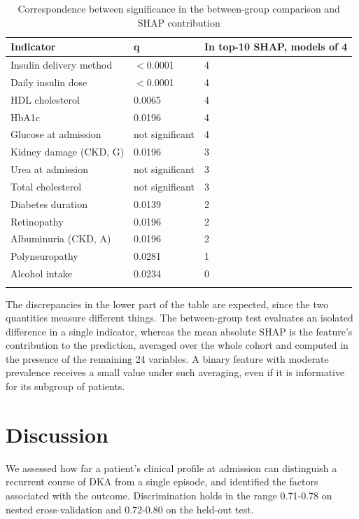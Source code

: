 \documentclass[pdflatex,sn-basic,Numbered]{sn-jnl}
\begin{document}
\begin{table}[h]
\caption{Correspondence between significance in the between-group comparison and SHAP contribution}\label{tab7}%
\begin{tabular}{@{}lll@{}}
\toprule
Indicator & q & In top-10 SHAP, models of 4\\
\midrule
Insulin delivery method & $<$0.0001 & 4\\
Daily insulin dose & $<$0.0001 & 4\\
HDL cholesterol & 0.0065 & 4\\
HbA1c & 0.0196 & 4\\
Glucose at admission & not significant & 4\\
Kidney damage (CKD, G) & 0.0196 & 3\\
Urea at admission & not significant & 3\\
Total cholesterol & not significant & 3\\
Diabetes duration & 0.0139 & 2\\
Retinopathy & 0.0196 & 2\\
Albuminuria (CKD, A) & 0.0196 & 2\\
Polyneuropathy & 0.0281 & 1\\
Alcohol intake & 0.0234 & 0\\
\botrule
\end{tabular}
\end{table}

The discrepancies in the lower part of the table are expected, since the two quantities measure different things. The between-group test evaluates an isolated difference in a single indicator, whereas the mean absolute SHAP is the feature's contribution to the prediction, averaged over the whole cohort and computed in the presence of the remaining 24 variables. A binary feature with moderate prevalence receives a small value under such averaging, even if it is informative for its subgroup of patients.

\section{Discussion}\label{sec4}

We assessed how far a patient's clinical profile at admission can distinguish a recurrent course of DKA from a single episode, and identified the factors associated with the outcome. Discrimination holds in the range 0.71-0.78 on nested cross-validation and 0.72-0.80 on the held-out test.
\end{document}

